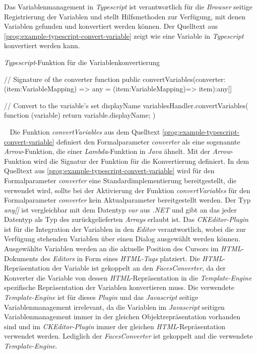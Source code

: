 \newline
\newline
Das Variablenmanagement in \emph{Typescript} ist verantwortlich für die \emph{Browser} seitige Registrierung der Variablen und stellt Hilfsmethoden zur Verfügung, mit denen Variablen gefunden und konvertiert werden können. Der Quelltext aus \ref{prog:example-typescript-convert-variable} zeigt wie eine Variable in \emph{Typescript} konvertiert werden kann.
\newpage
\begin{program}[h]
\caption{\emph{Typescript}-Funktion für die Variablenkonvertierung}
\label{prog:example-typescript-convert-variable}
\begin{JsCode}[numbers=none]
// Signature of the converter function
public convertVariables(converter:(item:VariableMapping) => any 
                        = (item:VariableMapping)=> item):any[]

// Convert to the variable's set displayName
variablesHandler.convertVariables(
	function (variable) {
		return variable.displayName;
	}
)                        
\end{JsCode} 
\end{program}
\ \newline
Die Funktion \emph{convertVariables} aus dem Quelltext \ref{prog:example-typescript-convert-variable} definiert den Formalparameter \emph{converter} als eine sogenannte \emph{Arrow}-Funktion, die einer \emph{Lambda}-Funktion in \emph{Java} ähnelt. Mit der \emph{Arrow}-Funktion wird die Signatur der Funktion für die Konvertierung definiert. In dem Quelltext aus \ref{prog:example-typescript-convert-variable} wird für den Formalparameter \emph{converter} eine Standardimplementierung bereitgestellt, die verwendet wird, sollte bei der Aktivierung der Funktion \emph{convertVariables} für den Formalparameter \emph{converter} kein Aktualparameter bereitgestellt werden. Der Typ \emph{any[]} ist vergleichbar mit dem Datentyp \emph{var} aus \emph{.NET} und gibt an das jeder Datentyp als Typ des zurückgelieferten \emph{Arrays} erlaubt ist.
\newline
\newline
Das \emph{CKEditor-Plugin} ist für die Integration der Variablen in den \emph{Editor} verantwortlich, wobei die zur Verfügung stehenden Variablen über einen Dialog ausgewählt werden können. Ausgewählte Variablen werden an die aktuelle Position des Cursors im \emph{HTML}-Dokuments des \emph{Editors} in Form eines \emph{HTML-Tags} platziert. Die \emph{HTML}-Repräsentation der Variable ist gekoppelt an den \emph{FacesConverter}, da der Konverter die Variable von dessen \emph{HTML}-Repräsentation in die \emph{Template-Engine} spezifische Repräsentation der Variablen  konvertieren muss. Die verwendete \emph{Template-Engine} ist für dieses \emph{Plugin} und das \emph{Javascript} seitige Variablenmanagement irrelevant, da die Variablen im \emph{Javascript} seitigen Variablenmanagement immer in der gleichen Objektrepräsentation vorhanden sind und im \emph{CKEditor-Plugin} immer der gleichen \emph{HTML}-Repräsentation verwendet werden. Lediglich der \emph{FacesConverter} ist gekoppelt and die verwendete \emph{Template-Engine}.
